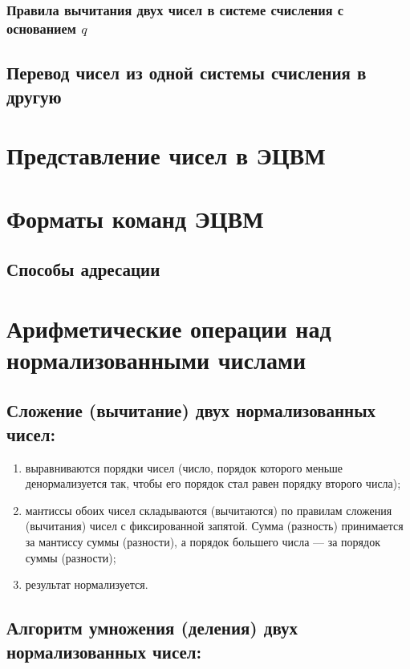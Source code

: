 \documentclass[10pt,a4paper,titlepage]{article}
\begin{document}
\subsubsection{Правила вычитания двух чисел в системе счисления с основанием $q$}

\subsection{Перевод чисел из одной системы счисления в другую}


\newpage
\section{Представление чисел в ЭЦВМ}

\newpage
\section{Форматы команд ЭЦВМ}

\subsection{Способы адресации}

\newpage
\section{Арифметические операции над нормализованными числами}

\subsection{Сложение (вычитание) двух нормализованных чисел:}

\begin{enumerate}
\item выравниваются порядки чисел (число, порядок которого меньше денормализуется так, чтобы его порядок стал равен порядку второго числа);
\item мантиссы обоих чисел складываются (вычитаются) по правилам сложения (вычитания) чисел с фиксированной запятой.
Сумма (разность) принимается за мантиссу суммы (разности), а порядок большего числа --- за порядок суммы (разности);
\item результат нормализуется.
\end{enumerate}

\subsection{Алгоритм умножения (деления) двух нормализованных чисел:}
\end{document}
